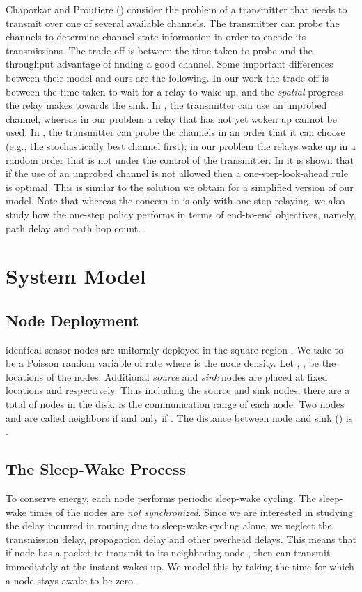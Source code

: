 \documentclass[onecolumn]{IEEEtran}
\begin{document}
Chaporkar and Proutiere (\cite{chaporkar-proutiere08joint-probing})
consider the problem of a transmitter that needs to transmit over one
of several available channels. The transmitter can probe the channels
to determine channel state information in order to encode its
transmissions. The trade-off is between the time taken to probe and
the throughput advantage of finding a good channel. Some important
differences between their model and ours are the following.  In our
work the trade-off is between the time taken to wait for a relay to
wake up, and the \emph{spatial} progress the relay makes towards the
sink. In \cite{chaporkar-proutiere08joint-probing}, the transmitter
can use an unprobed channel, whereas in our problem a relay that has
not yet woken up cannot be used. In
\cite{chaporkar-proutiere08joint-probing}, the transmitter can probe
the channels in an order that it can choose (e.g., the stochastically
best channel first); in our problem the relays wake up in a random
order that is not under the control of the transmitter. In
\cite{chaporkar-proutiere08joint-probing} it is shown that if the use
of an unprobed channel is not allowed then a one-step-look-ahead rule
is optimal. This is similar to the solution we obtain for a simplified
version of our model. Note that whereas the concern in
\cite{chaporkar-proutiere08joint-probing} is only with one-step
relaying, we also study how the one-step policy performs in terms of
end-to-end objectives, namely, path delay and path hop count.

\section{System Model}
\label{system_model}
\subsection{Node Deployment}
 identical sensor nodes are uniformly deployed in the square region
. We take  to be a Poisson random variable of rate
 where  is the node density. Let ,
, be the locations of the nodes. Additional \emph{source} and
\emph{sink} nodes are placed at fixed locations  and
 respectively. Thus including the source and sink
nodes, there are a total of  nodes in the disk.  is the
communication range of each node. Two nodes  and  are called
neighbors if and only if . The distance between
node  and sink () is .
\subsection{The Sleep-Wake Process}
To conserve energy, each node performs periodic sleep-wake cycling.
The sleep-wake times of the nodes are \emph{not synchronized}. Since
we are interested in studying the delay incurred in routing due to
sleep-wake cycling alone, we neglect the transmission delay,
propagation delay and other overhead delays. This means that if node
 has a packet to transmit to its neighboring node , then 
can transmit immediately at the instant  wakes up.  We model this
by taking the time for which a node stays awake to be zero.
\end{document}
